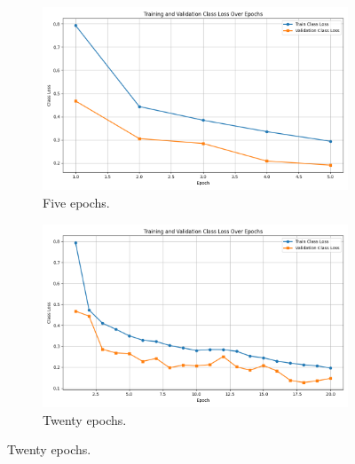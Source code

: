 \begin{figure}[!ht]
    \centering
    \begin{subfigure}[b]{0.65\textwidth}
        \centering
        \includegraphics[width=\textwidth]{Figures/Results/Graphs/5_Epochs/class_loss_plot.png}
        \caption{Five epochs.}
        \label{fig:5_E}
    \end{subfigure}

    \vskip 0.5cm
    \begin{subfigure}[b]{0.65\textwidth}
        \centering
        \includegraphics[width=\textwidth]{Figures/Results/Graphs/20_Epochs/class_loss_plot.png}
        \caption{Twenty epochs.}
        \label{fig:20_E}
    \end{subfigure}
    

\end{figure}
